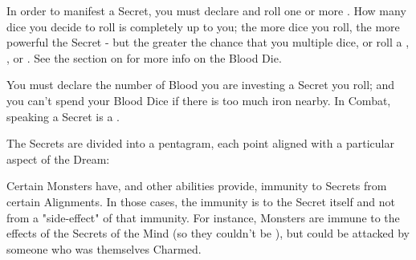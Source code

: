 
In order to manifest a Secret, you must declare and roll one or more . How many dice you decide to roll is completely up to you; the more dice you roll, the more powerful the Secret - but the greater the chance that you  multiple dice, or roll a , , or .  See the section on  for more info on the Blood Die.

You must declare the number of Blood you are investing a Secret  you roll; and you can't spend your Blood Dice if there is too much iron nearby. In Combat, speaking a Secret is a .


The Secrets are divided into a pentagram, each point aligned with a particular aspect of the Dream:



Certain Monsters have, and other abilities provide, immunity to Secrets from certain Alignments. In those cases, the immunity is to the Secret itself and not from a "side-effect" of that immunity.  For instance,  Monsters are immune to the effects of the Secrets of the Mind (so they couldn't be ), but could be attacked by someone who was themselves Charmed.

